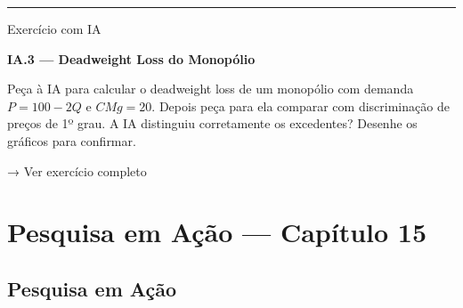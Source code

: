 \documentclass[11pt,twoside,openright]{book}
\begin{document}
\begin{center}\rule{0.5\linewidth}{0.5pt}\end{center}

\begin{tipbox}{Exercício com IA}

\textbf{IA.3 --- Deadweight Loss do Monopólio}

Peça à IA para calcular o deadweight loss de um monopólio com demanda
\(P = 100 - 2Q\) e \(CMg = 20\). Depois peça para ela comparar com
discriminação de preços de 1º grau. A IA distinguiu corretamente os
excedentes? Desenhe os gráficos para confirmar.

→ Ver exercício completo

\end{tipbox}

\chapter{Pesquisa em Ação --- Capítulo
15}\label{pesquisa-em-auxe7uxe3o-capuxedtulo-15}

\section{Pesquisa em Ação}\label{pesquisa-em-auxe7uxe3o-1}
\end{document}
